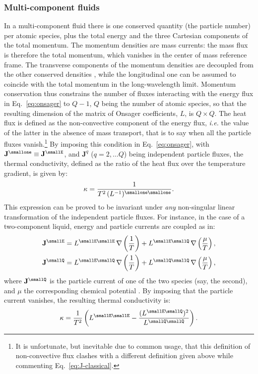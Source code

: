 \subsubsection{Multi-component fluids} \label{sec:multi-component}
In a multi-component fluid there is one conserved quantity (the particle number) per atomic species, plus the total energy and the three Cartesian components of the total momentum. The momentum densities are mass currents: the mass flux is therefore the total momentum, which vanishes in the center of mass reference frame. The transverse components of the momentum densities are decoupled from the other conserved densities \citep{Foster1975}, while the longitudinal one can be assumed to coincide with the total momentum in the long-wavelength limit. Momentum conservation thus constrains the number of fluxes interacting with the energy flux in Eq.~\eqref{eq:onsager} to $Q-1$, $Q$ being the number of atomic species, so that the resulting dimension of the matrix of Onsager coefficients, $L$, is $Q\times Q$. The heat flux is defined as the non-convective component of the energy flux, \emph{i.e.} the value of the latter in the absence of mass transport, that is to say when all the particle fluxes vanish.\footnote{It is unfortunate, but inevitable due to common usage, that this definition of non-convective flux clashes with a different definition given above while commenting Eq.~\eqref{eq:J-classical}.} By imposing this condition in Eq.~\eqref{eq:onsager}, with $\mathbf J^\smallone \equiv \mathbf{J}^\smallE$, and $\mathbf{J}^{q}$ ($q =2,\dots Q$) being independent particle fluxes, the thermal conductivity, defined as the ratio of the heat flux over the temperature gradient, is given by:
\begin{equation}
\kappa = \frac{1}{T^2 \,(L^{-1})^{\smallone\smallone}}. \label{eq:multi_kappa}
\end{equation}
This expression can be proved to be invariant under \textit{any} non-singular linear transformation of the independent particle fluxes. For instance, in the case of a two-component liquid, energy and particle currents are coupled as in:
\begin{equation}
  \begin{aligned}
    \mathbf{J}^\smallE &= L^{\smallE\smallE}\,  \nabla \left (\frac{1}{T} \right ) + L^{\smallE\smallQ} \, \nabla \left (\frac{\mu}{T} \right ), \\
    \mathbf{J}^{\smallQ} &= L^{\smallE\smallQ} \, \nabla \left (\frac{1}{T} \right ) + L^{\smallQ\smallQ} \, \nabla \left (\frac{\mu}{T} \right ), \label{eq:two-comp-constitutive}
  \end{aligned}
\end{equation}
where $\mathbf{J}^{\smallQ}$ is the particle current of one of the two species (say, the second), and $\mu$ the corresponding chemical potential \citep{Sindzingre1990}. By imposing that the particle current vanishes, the resulting thermal conductivity is:
\begin{equation}
  \kappa=\frac{1}{T^2}
  \left( L^{\smallE\smallE} - \frac{(L^{\smallE\smallQ})^2}{L^{\smallQ\smallQ}} \right). \label{eq:two-comp-kappa}
\end{equation}


